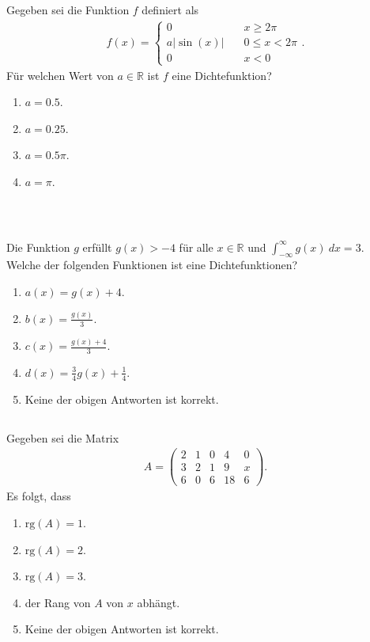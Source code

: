 \subsection*{}
Gegeben sei die Funktion $f $ definiert als 
\begin{align*}
	f(x)
	=
	\begin{cases}
		0 \quad & x \geq 2 \pi\\
		a | \sin(x)  | \quad &0 \leq x < 2 \pi\\
		0 \quad &x<0
	\end{cases}.
\end{align*}
Für welchen Wert von $a \in \mathbb{R}$ ist $f$ eine Dichtefunktion?
\renewcommand{\labelenumi}{(\alph{enumi})}
\begin{enumerate}
	\item 
	$a = 0.5$.
	\item
	$a =0.25$.
	\item
	$a = 0.5 \pi $.
	\item
	$a = \pi$.
\end{enumerate}
\ \\
\subsection*{}
Die Funktion $g$ erfüllt $g(x) > -4$ für alle $x \in \mathbb{R}$ und $\int_{- \infty}^\infty g(x) \ dx = 3$.\\
Welche der folgenden Funktionen ist eine Dichtefunktionen?
\renewcommand{\labelenumi}{(\alph{enumi})}
\begin{enumerate}
\item 
$ a(x) = g(x) + 4$.
\item 
$ b(x) = \frac{g(x)}{3}$.
\item
$ c(x) = \frac{g(x) + 4}{3} $.
\item
$ d(x) = \frac{3}{4} g(x) + \frac{1}{4} $.
\item
Keine der obigen Antworten ist korrekt.
\end{enumerate}

\newpage
\subsection*{}
Gegeben sei die Matrix
\begin{align*}
	A =
	\begin{pmatrix}
		2 & 1 & 0 & 4 & 0 \\
		3 & 2 & 1 & 9 & x \\
		6 & 0 & 6 & 18 & 6 
	\end{pmatrix}.
\end{align*}
Es folgt, dass
\renewcommand{\labelenumi}{(\alph{enumi})}
\begin{enumerate}
	\item 
	$ \mathrm{rg}(A) = 1 $.
	\item 
	$ \mathrm{rg}(A) = 2 $.
	\item
	$ \mathrm{rg}(A) = 3 $.
	\item
	der Rang von $A$ von $x$ abhängt.
	\item
	Keine der obigen Antworten ist korrekt.
\end{enumerate}
\ \\

